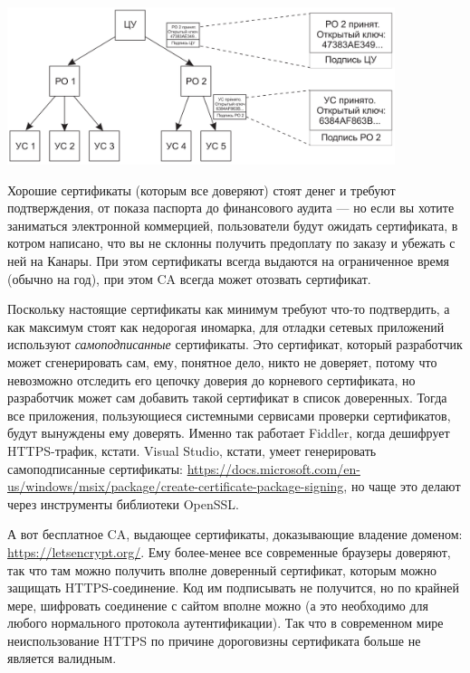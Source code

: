 \documentclass{../../text-style}
\begin{document}
\begin{center}
    \includegraphics[width=0.85\textwidth]{certHierarchy.png}
\end{center}

Хорошие сертификаты (которым все доверяют) стоят денег и требуют подтверждения, от показа паспорта до финансового аудита --- но если вы хотите заниматься электронной коммерцией, пользователи будут ожидать сертификата, в котром написано, что вы не склонны получить предоплату по заказу и убежать с ней на Канары. При этом сертификаты всегда выдаются на ограниченное время (обычно на год), при этом CA всегда может отозвать сертификат.

Поскольку настоящие сертификаты как минимум требуют что-то подтвердить, а как максимум стоят как недорогая иномарка, для отладки сетевых приложений используют \textit{самоподписанные} сертификаты. Это сертификат, который разработчик может сгенерировать сам, ему, понятное дело, никто не доверяет, потому что невозможно отследить его цепочку доверия до корневого сертификата, но разработчик может сам добавить такой сертификат в список доверенных. Тогда все приложения, пользующиеся системными сервисами проверки сертификатов, будут вынуждены ему доверять. Именно так работает Fiddler, когда дешифрует HTTPS-трафик, кстати. Visual Studio, кстати, умеет генерировать самоподписанные сертификаты: \url{https://docs.microsoft.com/en-us/windows/msix/package/create-certificate-package-signing}, но чаще это делают через инструменты библиотеки OpenSSL. 

А вот бесплатное CA, выдающее сертификаты, доказывающие владение доменом: \url{https://letsencrypt.org/}. Ему более-менее все современные браузеры доверяют, так что там можно получить вполне доверенный сертификат, которым можно защищать HTTPS-соединение. Код им подписывать не получится, но по крайней мере, шифровать соединение с сайтом вполне можно (а это необходимо для любого нормального протокола аутентификации). Так что в современном мире неиспользование HTTPS по причине дороговизны сертификата больше не является валидным.
\end{document}
